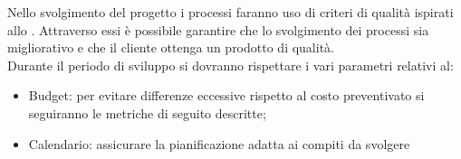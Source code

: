 \documentclass[../piano_di_qualifica.tex]{subfiles}
\begin{document}
Nello svolgimento del progetto i processi faranno uso di criteri di qualità ispirati allo . Attraverso essi è possibile garantire che lo svolgimento dei processi sia migliorativo e che il cliente ottenga un prodotto di qualità. \\
Durante il periodo di sviluppo si dovranno rispettare i vari parametri relativi al:
\begin{itemize}
\item Budget: per evitare differenze eccessive rispetto al costo preventivato si seguiranno le metriche di seguito descritte;
\item Calendario: assicurare la pianificazione adatta ai compiti da svolgere
\end{itemize}
%
\end{document}
